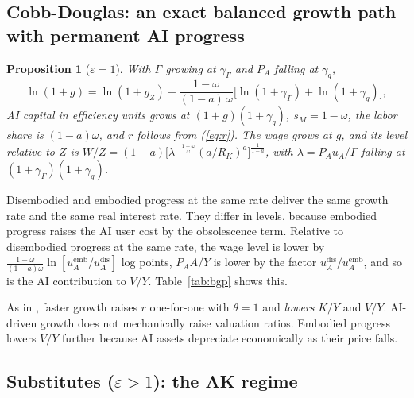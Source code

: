 \documentclass[11pt]{article}
\newtheorem{proposition}{Proposition}
\newcommand{\e}{\varepsilon}
\begin{document}
\subsection{Cobb-Douglas: an exact balanced growth path with permanent AI progress}

\begin{proposition}[$\e=1$]
With $\Gamma$ growing at $\gamma_\Gamma$ and $P_A$ falling at $\gamma_q$,
\begin{equation}
\ln(1+g) = \ln(1+g_Z) + \frac{1-\omega}{(1-a)\,\omega}\big[\ln(1+\gamma_\Gamma)+\ln(1+\gamma_q)\big],
\end{equation}
AI capital in efficiency units grows at $(1+g)(1+\gamma_q)$, $s_M=1-\omega$, the labor
share is $(1-a)\omega$, and $r$ follows from (\ref{eq:r}). The wage grows at $g$, and its
level relative to $Z$ is
$W/Z=(1-a)\big[\lambda^{-\frac{1-\omega}{\omega}}(a/R_K)^a\big]^{\frac{1}{1-a}}$, with
$\lambda=P_Au_A/\Gamma$ falling at $(1+\gamma_\Gamma)(1+\gamma_q)$.
\end{proposition}

Disembodied and embodied progress at the same rate deliver the same growth rate and
the same real interest rate. They differ in levels, because embodied progress raises
the AI user cost by the obsolescence term. Relative to disembodied progress at the same
rate, the wage level is lower by
$\frac{1-\omega}{(1-a)\omega}\ln[u_A^{\text{emb}}/u_A^{\text{dis}}]$ log points,
$P_AA/Y$ is lower by the factor $u_A^{\text{dis}}/u_A^{\text{emb}}$, and so is the AI
contribution to $V/Y$. Table~\ref{tab:bgp} shows this.

\begin{table}[t]\centering\small
\caption{Cobb-Douglas balanced growth paths ($\e=1$). Rates in percent. $W/Z$ is relative to the no-progress path, with all three paths starting from the same $\Gamma/P_A$ at $t=0$.}\label{tab:bgp}

\end{table}

As in \citet{kiley2000}, faster growth raises $r$ one-for-one with $\theta=1$ and
\emph{lowers} $K/Y$ and $V/Y$. AI-driven growth does not mechanically raise valuation
ratios. Embodied progress lowers $V/Y$ further because AI assets depreciate economically
as their price falls.

\subsection{\texorpdfstring{Substitutes ($\e>1$)}{Substitutes (epsilon > 1)}: the AK regime}
\end{document}

